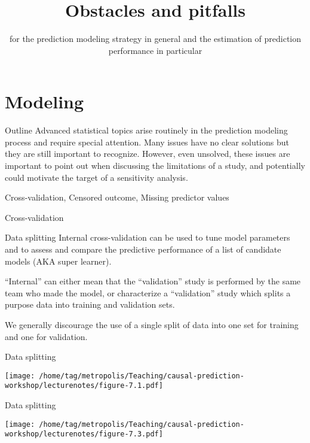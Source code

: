 \documentclass{beamer}\usepackage{listings}
\institute{}
\subtitle{for the prediction modeling strategy in general and the estimation of prediction performance in particular}
\date{}
\title{Obstacles and pitfalls}
\begin{document}
\maketitle
\section{Modeling}
\label{sec:orgd2a1be2}

\begin{frame}[label={sec:org433c3e6}]{Outline}
Advanced statistical topics arise routinely in the prediction
modeling process and require special attention.
\vfill
Many issues
have no clear solutions but they are still important to
recognize.
\vfill
However, even unsolved, these issues are important to point
out when discussing the limitations of a study, and potentially could
motivate the target of a sensitivity analysis.
\vfill

Cross-validation, Censored outcome, Missing predictor values
\end{frame}
\begin{frame}[label={sec:org00c63f1}]{}
\huge \color{white}
Cross-validation
\end{frame}
\begin{frame}[label={sec:org04c91c0}]{Data splitting}
Internal cross-validation can be used to tune model parameters and to
assess and compare the predictive performance of a list of candidate
models (AKA super learner).

\vfill ``Internal'' can either mean that the
``validation'' study is performed by the same team who made the model,
or characterize a ``validation'' study which splits a
purpose data into training and validation sets. \vfill

We generally \alert{discourage} the use of a \alert{single split} of data into one set
for training and one for validation.
\end{frame}
\begin{frame}[label={sec:orge9fb54d}]{Data splitting}
\begin{center}
\texttt{[image: /home/tag/metropolis/Teaching/causal-prediction-workshop/lecturenotes/figure-7.1.pdf]}
\end{center}
\end{frame}
\begin{frame}[label={sec:org689d3b6}]{Data splitting}
\begin{center}
\texttt{[image: /home/tag/metropolis/Teaching/causal-prediction-workshop/lecturenotes/figure-7.3.pdf]}
\end{center}
\end{frame}
\end{document}
